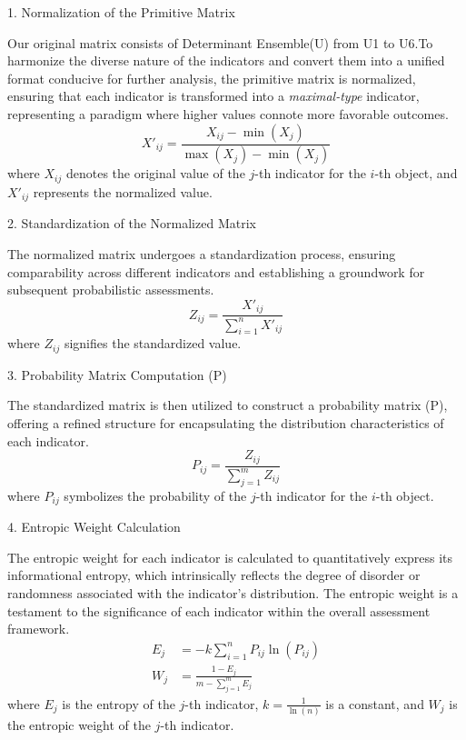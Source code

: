 \documentclass{mcmthesis}
\begin{document}
1. Normalization of the Primitive Matrix

Our original matrix consists of Determinant Ensemble(U) from U1 to U6.To harmonize the diverse nature of the indicators and convert them into a unified format conducive for further analysis, the primitive matrix is normalized, ensuring that each indicator is transformed into a \textit{maximal-type} indicator, representing a paradigm where higher values connote more favorable outcomes.
\begin{equation}
X'_{ij} = \frac{X_{ij} - \min(X_j)}{\max(X_j) - \min(X_j)}
\end{equation}
where $X_{ij}$ denotes the original value of the $j$-th indicator for the $i$-th object, and $X'_{ij}$ represents the normalized value.

2. Standardization of the Normalized Matrix

The normalized matrix undergoes a standardization process, ensuring comparability across different indicators and establishing a groundwork for subsequent probabilistic assessments.
\begin{equation}
Z_{ij} = \frac{X'_{ij}}{\sum_{i=1}^n X'_{ij}}
\end{equation}
where $Z_{ij}$ signifies the standardized value.

3. Probability Matrix Computation (P)

The standardized matrix is then utilized to construct a probability matrix (P), offering a refined structure for encapsulating the distribution characteristics of each indicator.
\begin{equation}
P_{ij} = \frac{Z_{ij}}{\sum_{j=1}^m Z_{ij}}
\end{equation}
where $P_{ij}$ symbolizes the probability of the $j$-th indicator for the $i$-th object.

4. Entropic Weight Calculation

The entropic weight for each indicator is calculated to quantitatively express its informational entropy, which intrinsically reflects the degree of disorder or randomness associated with the indicator's distribution. The entropic weight is a testament to the significance of each indicator within the overall assessment framework.
\begin{align}
E_j &= -k \sum_{i=1}^n P_{ij} \ln(P_{ij}) \\
W_j &= \frac{1 - E_j}{m - \sum_{j=1}^m E_j}
\end{align}
where $E_j$ is the entropy of the $j$-th indicator, $k = \frac{1}{\ln(n)}$ is a constant, and $W_j$ is the entropic weight of the $j$-th indicator.
\end{document}
